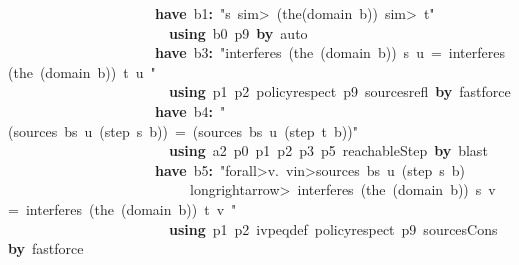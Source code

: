 \documentclass{article}
\newcommand{\syntaxKEYWORDA}[1]{\textcolor[rgb]{0.0,0.4,0.6}{\textbf{#1}}}
\newcommand{\syntaxLITERALA}[1]{\textcolor[rgb]{1.0,0.0,0.8}{#1}}
\newcommand{\syntaxOPERATOR}[1]{\textcolor[rgb]{0.0,0.0,0.0}{\textbf{#1}}}
\newcommand{\syntaxKEYWORDA}[1]{\textcolor[rgb]{0.0,0.4,0.6}{\textbf{#1}}}
\newcommand{\syntaxLITERALA}[1]{\textcolor[rgb]{1.0,0.0,0.8}{#1}}
\newcommand{\syntaxOPERATOR}[1]{\textcolor[rgb]{0.0,0.0,0.0}{\textbf{#1}}}
\newcommand{\syntaxKEYWORDA}[1]{\textcolor[rgb]{0.0,0.4,0.6}{\textbf{#1}}}
\newcommand{\syntaxLITERALA}[1]{\textcolor[rgb]{1.0,0.0,0.8}{#1}}
\newcommand{\syntaxOPERATOR}[1]{\textcolor[rgb]{0.0,0.0,0.0}{\textbf{#1}}}
\newcommand{\syntaxKEYWORDA}[1]{\textcolor[rgb]{0.0,0.4,0.6}{#1}}
\newcommand{\syntaxLITERALA}[1]{\textcolor[rgb]{1.0,0.0,0.8}{\textbf{#1}}}
\newcommand{\syntaxOPERATOR}[1]{\textcolor[rgb]{0.0,0.0,0.0}{#1}}
\newcommand{\syntaxKEYWORDA}[1]{\textcolor[rgb]{0.0,0.4,0.6}{\textbf{#1}}}
\newcommand{\syntaxLITERALA}[1]{\textcolor[rgb]{1.0,0.0,0.8}{#1}}
\newcommand{\syntaxOPERATOR}[1]{\textcolor[rgb]{0.0,0.0,0.0}{\textbf{#1}}}
\newcommand{\syntaxKEYWORDA}[1]{\textcolor[rgb]{0.0,0.4,0.6}{\textbf{#1}}}
\newcommand{\syntaxLITERALA}[1]{\textcolor[rgb]{1.0,0.0,0.8}{#1}}
\newcommand{\syntaxOPERATOR}[1]{\textcolor[rgb]{0.0,0.0,0.0}{\textbf{#1}}}
\begin{document}
{\ }{\ }{\ }{\ }{\ }{\ }{\ }{\ }{\ }{\ }{\ }{\ }{\ }{\ }{\ }{\ }{\ }{\ }{\ }{\ }{\ }\syntaxKEYWORDA{have}{\ }b1\syntaxOPERATOR{:}{\ }\syntaxLITERALA{"s{\ }\<sim>{\ }(the(domain{\ }b)){\ }\<sim>{\ }t"}\hspace*{\fill}\\
{\ }{\ }{\ }{\ }{\ }{\ }{\ }{\ }{\ }{\ }{\ }{\ }{\ }{\ }{\ }{\ }{\ }{\ }{\ }{\ }{\ }{\ }{\ }\syntaxKEYWORDA{using}{\ }b0{\ }p9{\ }\syntaxKEYWORDA{by}{\ }auto\hspace*{\fill}\\
{\ }{\ }{\ }{\ }{\ }{\ }{\ }{\ }{\ }{\ }{\ }{\ }{\ }{\ }{\ }{\ }{\ }{\ }{\ }{\ }{\ }\syntaxKEYWORDA{have}{\ }b3\syntaxOPERATOR{:}{\ }\syntaxLITERALA{"interferes{\ }(the{\ }(domain{\ }b)){\ }s{\ }u{\ }={\ }interferes{\ }(the{\ }(domain{\ }b)){\ }t{\ }u{\ }"}\hspace*{\fill}\\
{\ }{\ }{\ }{\ }{\ }{\ }{\ }{\ }{\ }{\ }{\ }{\ }{\ }{\ }{\ }{\ }{\ }{\ }{\ }{\ }{\ }{\ }{\ }\syntaxKEYWORDA{using}{\ }p1{\ }p2{\ }policy\usebox{\underscorebox}respect{\ }p9{\ }sources\usebox{\underscorebox}refl{\ }\syntaxKEYWORDA{by}{\ }fastforce\hspace*{\fill}\\
{\ }{\ }{\ }{\ }{\ }{\ }{\ }{\ }{\ }{\ }{\ }{\ }{\ }{\ }{\ }{\ }{\ }{\ }{\ }{\ }{\ }\syntaxKEYWORDA{have}{\ }b4\syntaxOPERATOR{:}{\ }\syntaxLITERALA{"(sources{\ }bs{\ }u{\ }(step{\ }s{\ }b)){\ }={\ }(sources{\ }bs{\ }u{\ }(step{\ }t{\ }b))"}\hspace*{\fill}\\
{\ }{\ }{\ }{\ }{\ }{\ }{\ }{\ }{\ }{\ }{\ }{\ }{\ }{\ }{\ }{\ }{\ }{\ }{\ }{\ }{\ }{\ }{\ }\syntaxKEYWORDA{using}{\ }a2{\ }p0{\ }p1{\ }p2{\ }p3{\ }p5{\ }reachableStep{\ }\syntaxKEYWORDA{by}{\ }blast\hspace*{\fill}\\
{\ }{\ }{\ }{\ }{\ }{\ }{\ }{\ }{\ }{\ }{\ }{\ }{\ }{\ }{\ }{\ }{\ }{\ }{\ }{\ }{\ }\syntaxKEYWORDA{have}{\ }b5\syntaxOPERATOR{:}{\ }\syntaxLITERALA{"\<forall>v.{\ }v\<in>sources{\ }bs{\ }u{\ }(step{\ }s{\ }b){\ }}\hspace*{\fill}\\
\syntaxLITERALA{{\ }{\ }{\ }{\ }{\ }{\ }{\ }{\ }{\ }{\ }{\ }{\ }{\ }{\ }{\ }{\ }{\ }{\ }{\ }{\ }{\ }{\ }{\ }{\ }{\ }{\ }\<longrightarrow>{\ }interferes{\ }(the{\ }(domain{\ }b)){\ }s{\ }v{\ }={\ }interferes{\ }(the{\ }(domain{\ }b)){\ }t{\ }v{\ }"}\hspace*{\fill}\\
{\ }{\ }{\ }{\ }{\ }{\ }{\ }{\ }{\ }{\ }{\ }{\ }{\ }{\ }{\ }{\ }{\ }{\ }{\ }{\ }{\ }{\ }{\ }\syntaxKEYWORDA{using}{\ }p1{\ }p2{\ }ivpeq\usebox{\underscorebox}def{\ }policy\usebox{\underscorebox}respect{\ }p9{\ }sources\usebox{\underscorebox}Cons{\ }\syntaxKEYWORDA{by}{\ }fastforce\hspace*{\fill}\\
\end{document}
